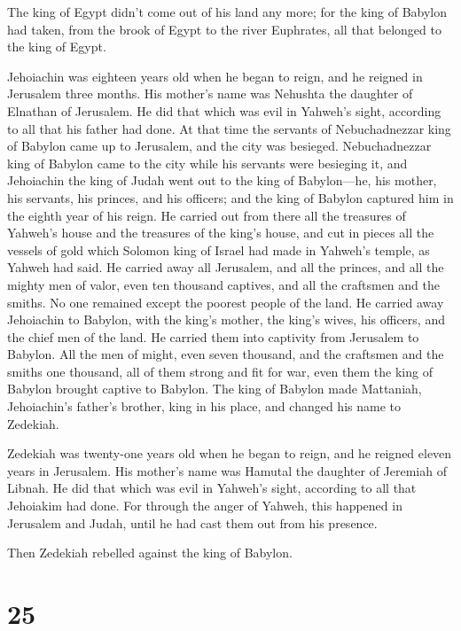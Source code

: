  The king of Egypt didn't come out of his land any more; for
the king of Babylon had taken, from the brook of Egypt to the river
Euphrates, all that belonged to the king of Egypt.

 Jehoiachin was eighteen years old when he began to reign,
and he reigned in Jerusalem three months. His mother's name was Nehushta
the daughter of Elnathan of Jerusalem.  He did that which
was evil in Yahweh's sight, according to all that his father had done.
 At that time the servants of Nebuchadnezzar king of
Babylon came up to Jerusalem, and the city was besieged. 
Nebuchadnezzar king of Babylon came to the city while his servants were
besieging it,  and Jehoiachin the king of Judah went out to
the king of Babylon---he, his mother, his servants, his princes, and his
officers; and the king of Babylon captured him in the eighth year of his
reign.  He carried out from there all the treasures of
Yahweh's house and the treasures of the king's house, and cut in pieces
all the vessels of gold which Solomon king of Israel had made in
Yahweh's temple, as Yahweh had said.  He carried away all
Jerusalem, and all the princes, and all the mighty men of valor, even
ten thousand captives, and all the craftsmen and the smiths. No one
remained except the poorest people of the land.  He carried
away Jehoiachin to Babylon, with the king's mother, the king's wives,
his officers, and the chief men of the land. He carried them into
captivity from Jerusalem to Babylon.  All the men of might,
even seven thousand, and the craftsmen and the smiths one thousand, all
of them strong and fit for war, even them the king of Babylon brought
captive to Babylon.  The king of Babylon made Mattaniah,
Jehoiachin's father's brother, king in his place, and changed his name
to Zedekiah.

 Zedekiah was twenty-one years old when he began to reign,
and he reigned eleven years in Jerusalem. His mother's name was Hamutal
the daughter of Jeremiah of Libnah.  He did that which was
evil in Yahweh's sight, according to all that Jehoiakim had done.
 For through the anger of Yahweh, this happened in
Jerusalem and Judah, until he had cast them out from his presence.

Then Zedekiah rebelled against the king of Babylon.

\hypertarget{section-24}{%
\section{25}\label{section-24}}

